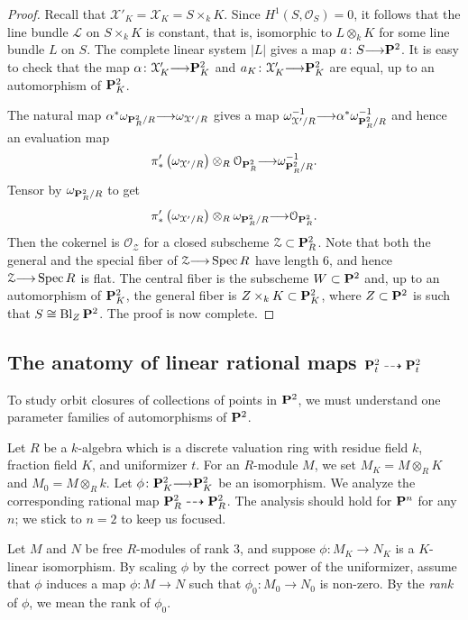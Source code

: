 \documentclass[12pt,reqno]{amsart}
\renewcommand{\k}{k}
\DeclareMathOperator{\Bl}{Bl}
\renewcommand{\to}{{\longrightarrow}}
\numberwithin{equation}{section}
\renewcommand{\O}{\mathcal O}
\begin{document}
\begin{proof}
  Recall that $\mathcal X'_K = \mathcal X_K = S \times_k K$.
  Since $H^1(S, \O_S) = 0$, it follows that the line bundle $\mathcal L$ on $S \times_k K$ is constant, that is, isomorphic to $L \otimes_k K$ for some line bundle $L$ on $S$.
  The complete linear system $|L|$ gives a map $a \colon S \to \P^2$.
  It is easy to check that the map $\alpha \colon \mathcal X'_K \to \P^2_K$ and $a_K \colon \mathcal X'_K \to \P^2_K$ are equal, up to an automorphism of $\P^2_K$.
  
  The natural map $\alpha^* \omega_{\P^2_R/R} \to \omega_{\mathcal X'/R}$ gives a map $\omega^{-1}_{\mathcal X'/R} \to \alpha^* \omega^{-1}_{\P^2_R/R}$ and hence an evaluation map
  \[ \pi'_* \left(\omega_{\mathcal X'/R}\right) \otimes_R \O_{\P^2_R} \to \omega_{\P^2_R/R}^{-1}.\]
  Tensor by $\omega_{\P^2_R/R}$ to get
  \[ \pi'_* \left(\omega_{\mathcal X'/R}\right) \otimes_R \omega_{\P^2_R/R} \to \O_{\P^2_R}.\]
  Then the cokernel is $\O_{\mathcal Z}$ for a closed subscheme $\mathcal Z \subset \P^2_R$.
  Note that both the general and the special fiber of $\mathcal Z \to \spec R$ have length 6, and hence $\mathcal Z \to \spec R$ is flat.
  The central fiber is the subscheme $W \subset \P^2$ and, up to an automorphism of $\P^2_K$, the general fiber is $Z \times_k K \subset \P^2_K$, where $Z \subset \P^2$ is such that $S \cong \Bl_Z \P^2$.
  The proof is now complete.
\end{proof}

\subsection{The anatomy of linear rational maps $\P_t^2 \dashrightarrow \P_t^2$}\label{sec:ratmap}
To study orbit closures of collections of points in $\P^2$, we must understand one parameter families of automorphisms of $\P^2$.

Let $R$ be a $\k$-algebra which is a discrete valuation ring with residue field $\k$, fraction field $K$, and uniformizer $t$.
For an $R$-module $M$, we set $M_K = M \otimes_R K$ and $M_0 = M \otimes_R \k$.
Let $\phi \colon \P^2_K \to \P^2_K$ be an isomorphism.
We analyze the corresponding rational map $\P^2_R \dashrightarrow \P^2_R$.
The analysis should hold for $\P^n$ for any $n$; we stick to $n = 2$ to keep us focused.

Let $M$ and $N$ be free $R$-modules of rank 3, and suppose $\phi \colon M_K \to N_K$ is a $K$-linear isomorphism.
By scaling $\phi$ by the correct power of the uniformizer, assume that $\phi$ induces a map $\phi \colon M \to N$ such that $\phi_0 \colon M_0 \to N_0$ is non-zero.
By the \emph{rank} of $\phi$, we mean the rank of $\phi_0$.
\end{document}
